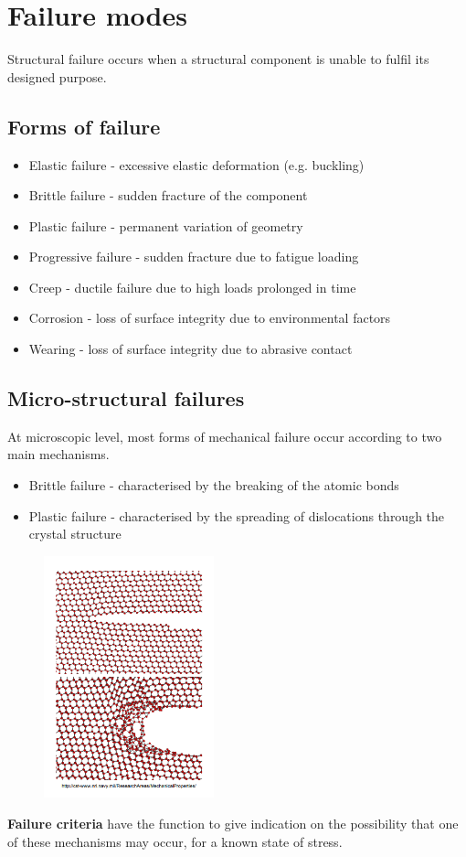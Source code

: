 \documentclass[class=report, crop=false, 12pt,a4paper]{standalone}
\begin{document}
\section{Failure modes}
Structural failure occurs when a structural component is unable to fulfil its designed purpose. 
\subsection{Forms of failure}
\begin{itemize}
  \item Elastic failure - excessive elastic deformation (e.g. buckling)
  \item Brittle failure - sudden fracture of the component
  \item Plastic failure - permanent variation of geometry
  \item Progressive failure - sudden fracture due to fatigue loading 
  \item Creep - ductile failure due to high loads prolonged in time
  \item Corrosion - loss of surface integrity due to environmental factors
  \item Wearing - loss of surface integrity due to abrasive contact
\end{itemize}
\subsection{Micro-structural failures}
At microscopic level, most forms of mechanical failure occur according to two main mechanisms.
\begin{itemize}
  \item Brittle failure - characterised by the breaking of the atomic bonds
  \item Plastic failure - characterised by the spreading of dislocations through the crystal structure
\end{itemize}
\begin{figure}[H]
  \centering
  \includegraphics[height = 7cm]{../img/diagram8.png}
  \caption{}
\end{figure}
\textbf{Failure criteria} have the function to give indication on the possibility that one of these mechanisms may occur, for a known state of stress.
\end{document}
